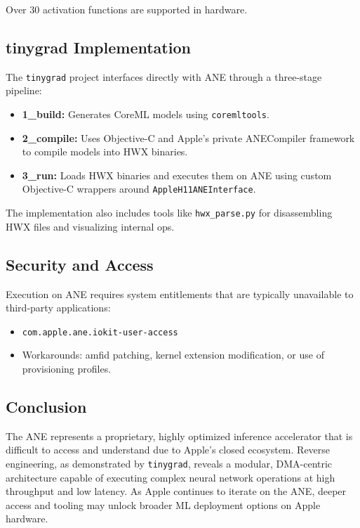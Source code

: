 Over 30 activation functions are supported in hardware.

\subsection{tinygrad Implementation}

The \texttt{tinygrad} project interfaces directly with ANE through a three-stage pipeline:

\begin{itemize}
  \item \textbf{1\_build:} Generates CoreML models using \texttt{coremltools}.
  \item \textbf{2\_compile:} Uses Objective-C and Apple's private ANECompiler framework to compile models into HWX binaries.
  \item \textbf{3\_run:} Loads HWX binaries and executes them on ANE using custom Objective-C wrappers around \texttt{AppleH11ANEInterface}.
\end{itemize}

The implementation also includes tools like \texttt{hwx\_parse.py} for disassembling HWX files and visualizing internal ops.

\subsection{Security and Access}

Execution on ANE requires system entitlements that are typically unavailable to third-party applications:

\begin{itemize}
  \item \texttt{com.apple.ane.iokit-user-access}
  \item Workarounds: amfid patching, kernel extension modification, or use of provisioning profiles.
\end{itemize}

\subsection{Conclusion}

The ANE represents a proprietary, highly optimized inference accelerator that is difficult to access and understand due to Apple’s closed ecosystem. Reverse engineering, as demonstrated by \texttt{tinygrad}, reveals a modular, DMA-centric architecture capable of executing complex neural network operations at high throughput and low latency. As Apple continues to iterate on the ANE, deeper access and tooling may unlock broader ML deployment options on Apple hardware.
